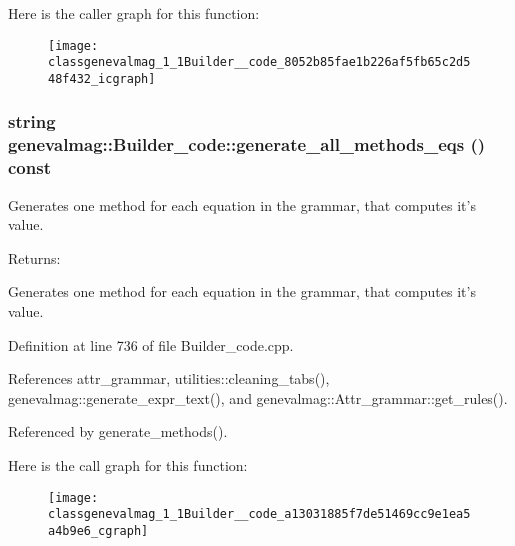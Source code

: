 Here is the caller graph for this function:\nopagebreak
\begin{figure}[H]
\begin{center}
\leavevmode
\texttt{[image: classgenevalmag\_1\_1Builder\_\_code\_8052b85fae1b226af5fb65c2d548f432\_icgraph]}
\end{center}
\end{figure}
\hypertarget{classgenevalmag_1_1Builder__code_a13031885f7de51469cc9e1ea5a4b9e6}{
\subsubsection[{generate\_\-all\_\-methods\_\-eqs}]{\setlength{\rightskip}{0pt plus 5cm}string genevalmag::Builder\_\-code::generate\_\-all\_\-methods\_\-eqs () const}}
\label{classgenevalmag_1_1Builder__code_a13031885f7de51469cc9e1ea5a4b9e6}


Generates one method for each equation in the grammar, that computes it's value. \begin{Desc}
\item[Returns:]\end{Desc}
Generates one method for each equation in the grammar, that computes it's value. 

Definition at line 736 of file Builder\_\-code.cpp.

References attr\_\-grammar, utilities::cleaning\_\-tabs(), genevalmag::generate\_\-expr\_\-text(), and genevalmag::Attr\_\-grammar::get\_\-rules().

Referenced by generate\_\-methods().

Here is the call graph for this function:\nopagebreak
\begin{figure}[H]
\begin{center}
\leavevmode
\texttt{[image: classgenevalmag\_1\_1Builder\_\_code\_a13031885f7de51469cc9e1ea5a4b9e6\_cgraph]}
\end{center}
\end{figure}


